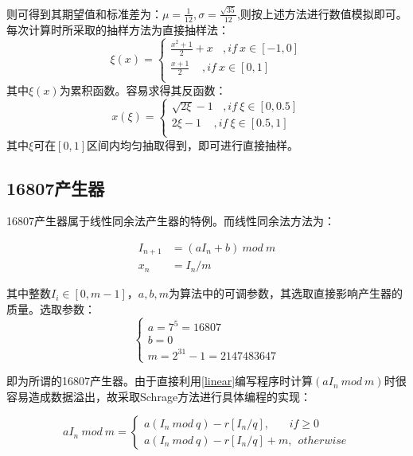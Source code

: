 \documentclass[a4paper,11pt]{article}
\begin{document}
则可得到其期望值和标准差为：$\mu = \frac{1}{12} ,\sigma = \frac{\sqrt{35}}{12}$,则按上述方法进行数值模拟即可。每次计算时所采取的抽样方法为直接抽样法：
\begin{equation}
\xi(x) = 
\left\{
\begin{array}{l}
\frac{x^{2}+1}{2}+x~~~~,if~x\in [-1,0]  \\
\frac{x+1}{2}~~~~~,if~x\in[0,1]  \\	
\end{array}
\right.
\end{equation}
其中$\xi(x)$为累积函数。容易求得其反函数：
\begin{equation}
x(\xi) = 
\left\{
\begin{array}{l}
\sqrt{2\xi}-1~~~~,if~\xi\in [0,0.5]  \\
2\xi-1~~~~~,if~\xi\in[0.5,1]  \\	
\end{array}
\right.
\end{equation}
其中$\xi$可在$[0,1]$区间内均匀抽取得到，即可进行直接抽样。





\subsection{16807产生器}
16807产生器属于线性同余法产生器的特例。而线性同余法方法为：

\begin{equation}
\begin{aligned}
	I_{n+1} &= (aI_{n} + b) \ mod \ m \\
	x_{n} &= I_{n}/m
\end{aligned}
\label{linear}	
\end{equation}

其中整数$I_{i} \in [0,m-1]$，$a,b,m$为算法中的可调参数，其选取直接影响产生器的质量。选取参数：
\begin{equation}
\left\{
\begin{array}{l}
	a = 7^{5} = 16807 \\
	b = 0 \\
	m = 2^{31}-1 = 2147483647
\end{array}
\right.
\end{equation}

即为所谓的16807产生器。由于直接利用\ref{linear}编写程序时计算$(aI_{n} \ mod \ m )$时很容易造成数据溢出，故采取Schrage方法进行具体编程的实现：

\begin{equation}
	aI_{n} \ mod \ m = \left\{
	\begin{array}{l}
		a(I_{n}\ mod \ q) - r[I_{n}/q],\ \ \ \ \ \ \ \ if \geq 0 \\
		a(I_{n}\ mod \ q) - r[I_{n}/q] + m,\ \ otherwise	
			\end{array}
	\right.
\end{equation}
\end{document}
